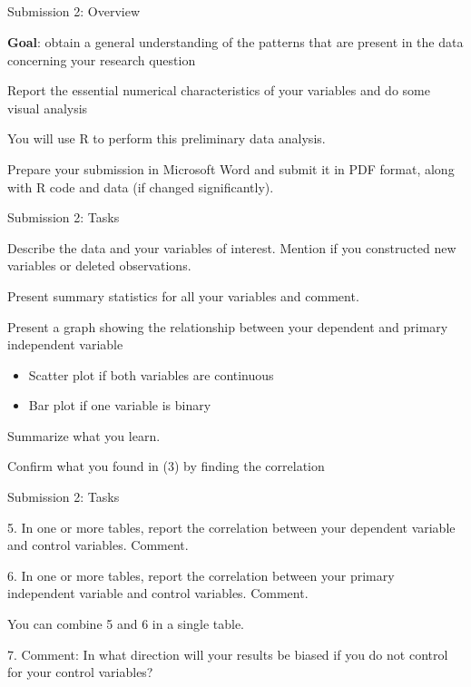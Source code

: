 \documentclass{./../Lectures/div_teaching_slides}
\begin{document}
\subsection{\vspace{1em}}


\begin{frame}{Submission 2: Overview}
\begin{witemize}
  \item  \textbf{Goal}: obtain a general understanding of the patterns that are present in the data concerning your research question
  \item Report the essential numerical characteristics of your variables and do some visual analysis
  \item You will use R to perform this preliminary data analysis.
  \item Prepare your submission in Microsoft Word and submit it in PDF format, along with R code and data (if changed significantly).
\end{witemize}
\end{frame}

\begin{frame}{Submission 2: Tasks}
\begin{wenumerate}
  \item Describe the data and your variables of interest. Mention if you constructed new variables or deleted observations.  
  \item Present summary statistics for all your variables and comment.
  \item Present a graph showing the relationship between your dependent and primary independent variable \\
  \begin{itemize}
  \item Scatter plot if both variables are continuous
  \item Bar plot if one variable is binary
\end{itemize}
Summarize what you learn. 
\item Confirm what you found in (3) by finding the correlation
\end{wenumerate}
\end{frame}

\begin{frame}{Submission 2: Tasks}
\begin{witemize}
\item[5.] In one or more tables, report the correlation between your dependent variable and control variables. Comment.
\item[6.]In one or more tables, report the correlation between your primary independent variable and control variables. Comment.
\item[] You can combine 5 and 6 in a single table.
\item[7.] Comment: In what direction will your results be biased if you do not control for your control variables?
\end{witemize}
\end{frame}
\end{document}
